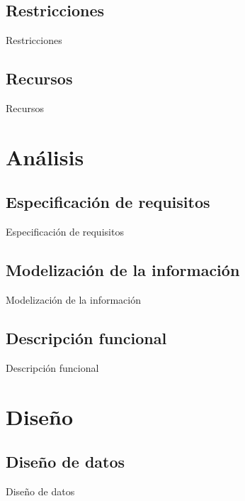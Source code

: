 \documentclass[10pt, hyperref={pdfpagelabels=false}]{beamer}
\begin{document}
    \subsection{Restricciones}
      \begin{frame}{Restricciones}

      \end{frame}

    \subsection{Recursos}
      \begin{frame}{Recursos}

      \end{frame}


  \section{Análisis}
    \subsection{Especificación de requisitos}
      \begin{frame}{Especificación de requisitos}

      \end{frame}

    \subsection{Modelización de la información}
      \begin{frame}{Modelización de la información}

      \end{frame}

    \subsection{Descripción funcional}
      \begin{frame}{Descripción funcional}

      \end{frame}


  \section{Diseño}
    \subsection{Diseño de datos}
      \begin{frame}{Diseño de datos}

      \end{frame}
\end{document}

